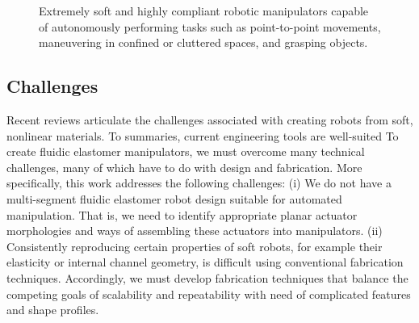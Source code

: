 \begin{figure}[ht]
\begin{subfigure}[t]{0.7\columnwidth}
        \end{subfigure}
        \caption{Extremely soft and highly compliant robotic manipulators capable of autonomously performing tasks such as point-to-point movements, maneuvering in confined or cluttered spaces, and grasping objects.}
	\label{fig:intro}
\end{figure}


\subsection{Challenges}
Recent reviews \citep{} articulate the challenges associated with creating robots from soft, nonlinear materials.
%
To summaries, current engineering tools are well-suited 
To create fluidic elastomer manipulators, we must overcome many technical challenges, many of which have to do with design and fabrication.
More specifically, this work addresses the following challenges:
(i) We do not have a multi-segment fluidic elastomer robot design suitable for automated manipulation.
That is, we need to identify appropriate planar actuator morphologies and ways of assembling these actuators into manipulators.
(ii) Consistently reproducing certain properties of soft robots, for example their elasticity or internal channel geometry, is difficult using conventional fabrication techniques.
Accordingly, we must develop fabrication techniques that balance the competing goals of scalability and repeatability with need of complicated features and shape profiles.

